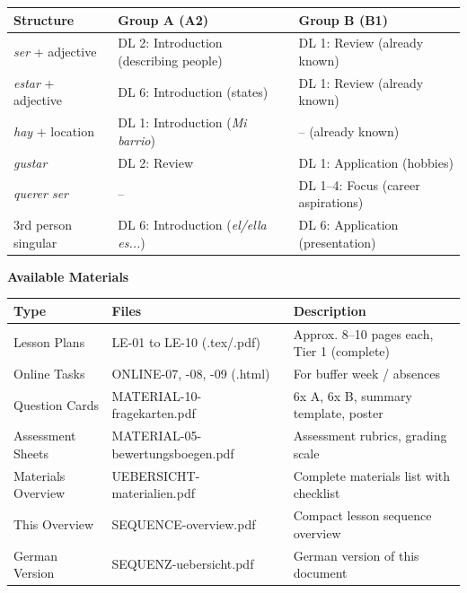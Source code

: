 \documentclass[11pt, a4paper]{article}
\newcommand{\es}[1]{\textcolor{spanisch}{\textit{#1}}}
\begin{document}
\begin{center}
\begin{tabular}{|p{3cm}|p{5.5cm}|p{5.5cm}|}
\hline
\rowcolor{hellgrau}
\textbf{Structure} & \textbf{Group A (A2)} & \textbf{Group B (B1)} \\
\hline
\es{ser} + adjective & DL 2: Introduction (describing people) & DL 1: Review (already known) \\
\hline
\es{estar} + adjective & DL 6: Introduction (states) & DL 1: Review (already known) \\
\hline
\es{hay} + location & DL 1: Introduction (\es{Mi barrio}) & -- (already known) \\
\hline
\es{gustar} & DL 2: Review & DL 1: Application (hobbies) \\
\hline
\es{querer ser} & -- & DL 1--4: Focus (career aspirations) \\
\hline
3rd person singular & DL 6: Introduction (\es{el/ella es...}) & DL 6: Application (presentation) \\
\hline
\end{tabular}
\end{center}

\vspace{0.5cm}


{\large\bfseries\color{spanisch} Available Materials}

\vspace{0.3cm}

\begin{tabular}{@{}p{4cm}p{5cm}p{6cm}@{}}
\textbf{Type} & \textbf{Files} & \textbf{Description} \\
\hline
Lesson Plans & LE-01 to LE-10 (.tex/.pdf) & Approx. 8--10 pages each, Tier 1 (complete) \\
Online Tasks & ONLINE-07, -08, -09 (.html) & For buffer week / absences \\
Question Cards & MATERIAL-10-fragekarten.pdf & 6x A, 6x B, summary template, poster \\
Assessment Sheets & MATERIAL-05-bewertungsboegen.pdf & Assessment rubrics, grading scale \\
Materials Overview & UEBERSICHT-materialien.pdf & Complete materials list with checklist \\
This Overview & SEQUENCE-overview.pdf & Compact lesson sequence overview \\
German Version & SEQUENZ-uebersicht.pdf & German version of this document \\
\end{tabular}
\end{document}
